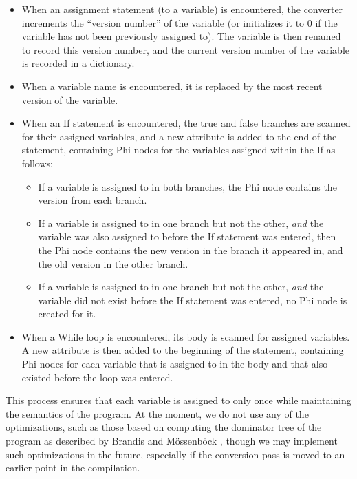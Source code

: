 \documentclass[11pt,twocolumn]{article}
\begin{document}
\begin{itemize}
\item When an assignment statement (to a variable) is encountered, the
  converter increments the ``version number'' of the variable (or
  initializes it to $0$ if the variable has not been previously
  assigned to). The variable is then renamed to record this version
  number, and the current version number of the variable is recorded
  in a dictionary.
\item When a variable name is encountered, it is replaced by the most
  recent version of the variable.
\item When an If statement is encountered, the true and false branches
  are scanned for their assigned variables, and a new attribute is
  added to the end of the statement, containing Phi nodes for the
  variables assigned within the If as follows:
  \begin{itemize}
  \item If a variable is assigned to in both branches, the Phi node
    contains the version from each branch.
  \item If a variable is assigned to in one branch but not the other,
    \textit{and} the variable was also assigned to before the If
    statement was entered, then the Phi node contains the new version
    in the branch it appeared in, and the old version in the other
    branch.
  \item If a variable is assigned to in one branch but not the other,
    \textit{and} the variable did not exist before the If
    statement was entered, no Phi node is created for it.
  \end{itemize}
\item When a While loop is encountered, its body is scanned for
  assigned variables. A new attribute is then added to the beginning
  of the statement, containing Phi nodes for each variable that is
  assigned to in the body and that also existed before the loop was
  entered.
\end{itemize}

This process ensures that each variable is assigned to only once while
maintaining the semantics of the program. At the moment, we do not use
any of the optimizations, such as those based on computing the
dominator tree of the program as described by Brandis and
M\"{o}ssenb\"{ock} \cite{brandis-mossenbock}, though we may implement such
optimizations in the future, especially if the conversion pass is
moved to an earlier point in the compilation.
\end{document}
